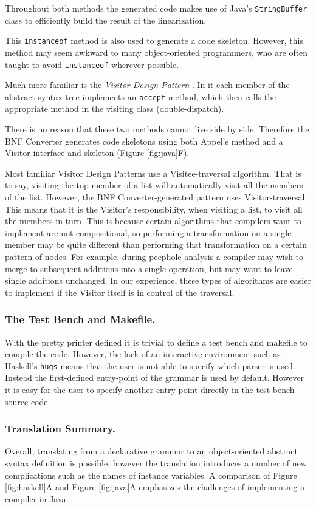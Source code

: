 \documentclass{llncs}
\newcommand{\shortsection}[1]{\subsubsection*{#1.}} %
\begin{document}
Throughout both methods the generated code makes use of Java's \texttt{StringBuffer} class to efficiently build the result of the linearization.

This \texttt{instanceof} method is also used to generate a code skeleton. However, this method may seem awkward to many object-oriented programmers, who are often taught to avoid \texttt{instanceof} wherever possible.

Much more familiar is the \textit{Visitor Design Pattern} \cite{visitor}. In it each member of the abstract syntax tree implements an \texttt{accept} method, which then calls the appropriate method in the visiting class (double-dispatch).

There is no reason that these two methods cannot live side by side. Therefore the BNF Converter generates code skeletons using both Appel's method and a Visitor interface and skeleton (Figure \ref{fig:java}F).

Most familiar Visitor Design Patterns use a Visitee-traversal algorithm. That is to say, visiting the top member of a list will automatically visit all the members of the list. However, the BNF Converter-generated pattern uses Visitor-traversal. This means that it is the Visitor's responsibility, when visiting a list, to visit all the members in turn. This is because certain algorithms that compilers want to implement are not compositional, so performing a transformation on a single member may be quite different than performing that transformation on a certain pattern of nodes. For example, during peephole analysis a compiler may wish to merge to subsequent additions into a single operation, but may want to leave single additions unchanged. In our experience, these types of algorithms are easier to implement if the Visitor itself is in control of the traversal.


\shortsection{The Test Bench and Makefile}

With the pretty printer defined it is trivial to define a test bench and makefile to compile the code. However, the lack of an interactive environment such as Haskell's \texttt{hugs} means that the user is not able to specify which parser is used. Instead the first-defined entry-point of the grammar is used by default. However it is easy for the user to specify another entry point directly in the test bench source code.

\shortsection{Translation Summary}

Overall, translating from a declarative grammar to an object-oriented 
abstract syntax definition is possible, however the translation introduces a number of new complications such as the names of instance variables. A comparison of Figure \ref{fig:haskell}A and Figure \ref{fig:java}A emphasizes the challenges of implementing a compiler in Java.
 
\end{document}
